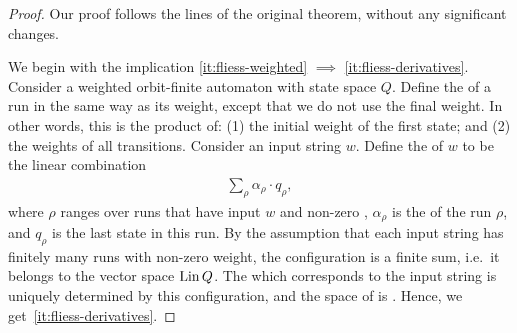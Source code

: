 \begin{proof} Our proof follows the lines of the original theorem, without any significant changes.

    \AP
    We begin with the implication \ref{it:fliess-weighted} $\implies$ \ref{it:fliess-derivatives}. Consider a weighted orbit-finite automaton with state space $Q$. 
    Define the  of a run in the same way as its weight, except that we do not use the final weight. In other words, this is the product of: (1) the initial weight of the first state; and (2) the weights of all transitions. Consider an input string $w$. Define the  of $w$ to be the linear combination
    \begin{align}
        \label{eq:configuration-wa}
        \sum_\rho \alpha_\rho \cdot q_\rho,
    \end{align}
    where $\rho$ ranges over runs that have input $w$ and non-zero ,
    $\alpha_\rho$ is the  of the run $\rho$, and $q_\rho$ is the last state in this run.
    By the assumption that each input string has finitely many runs with non-zero weight, 
    the configuration is a finite sum, i.e.~it belongs to the vector space $\operatorname{Lin} Q$. 
    The  which corresponds to the input string is uniquely determined 
    by this configuration, and the space of  is . 
    Hence, we get~\ref{it:fliess-derivatives}.


\end{proof}
